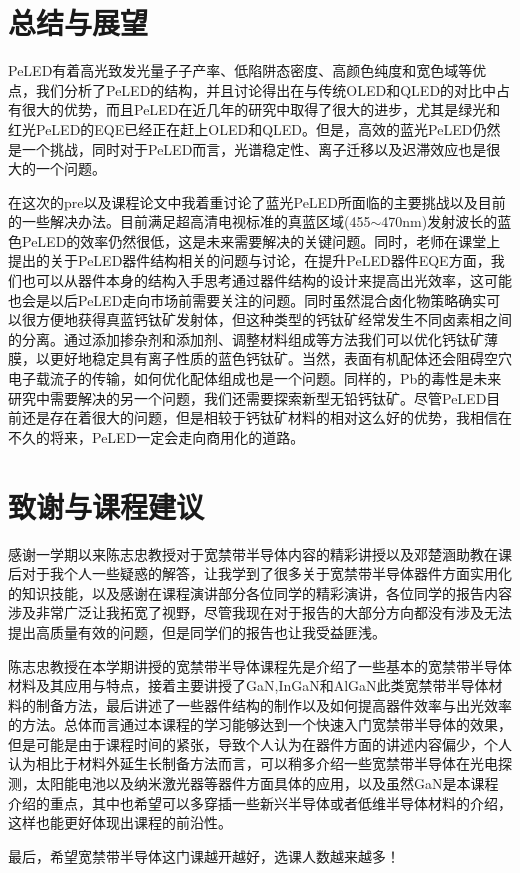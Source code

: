 \documentclass{phyasgn}\usepackage{nag}
\begin{document}
\section{总结与展望}
\par PeLED有着高光致发光量子子产率、低陷阱态密度、高颜色纯度和宽色域等优点，我们分析了PeLED的结构，并且讨论得出在与传统OLED和QLED的对比中占有很大的优势，而且PeLED在近几年的研究中取得了很大的进步，尤其是绿光和红光PeLED的EQE已经正在赶上OLED和QLED。但是，高效的蓝光PeLED仍然是一个挑战，同时对于PeLED而言，光谱稳定性、离子迁移以及迟滞效应也是很大的一个问题。
\par 在这次的pre以及课程论文中我着重讨论了蓝光PeLED所面临的主要挑战以及目前的一些解决办法。目前满足超高清电视标准的真蓝区域(455$\sim$470nm)发射波长的蓝色PeLED的效率仍然很低，这是未来需要解决的关键问题。同时，老师在课堂上提出的关于PeLED器件结构相关的问题与讨论，在提升PeLED器件EQE方面，我们也可以从器件本身的结构入手思考通过器件结构的设计来提高出光效率，这可能也会是以后PeLED走向市场前需要关注的问题。同时虽然混合卤化物策略确实可以很方便地获得真蓝钙钛矿发射体，但这种类型的钙钛矿经常发生不同卤素相之间的分离。通过添加掺杂剂和添加剂、调整材料组成等方法我们可以优化钙钛矿薄膜，以更好地稳定具有离子性质的蓝色钙钛矿。当然，表面有机配体还会阻碍空穴电子载流子的传输，如何优化配体组成也是一个问题。同样的，Pb的毒性是未来研究中需要解决的另一个问题，我们还需要探索新型无铅钙钛矿。尽管PeLED目前还是存在着很大的问题，但是相较于钙钛矿材料的相对这么好的优势，我相信在不久的将来，PeLED一定会走向商用化的道路。
\clearpage
\section{致谢与课程建议}
\par 感谢一学期以来陈志忠教授对于宽禁带半导体内容的精彩讲授以及邓楚涵助教在课后对于我个人一些疑惑的解答，让我学到了很多关于宽禁带半导体器件方面实用化的知识技能，以及感谢在课程演讲部分各位同学的精彩演讲，各位同学的报告内容涉及非常广泛让我拓宽了视野，尽管我现在对于报告的大部分方向都没有涉及无法提出高质量有效的问题，但是同学们的报告也让我受益匪浅。
\par 陈志忠教授在本学期讲授的宽禁带半导体课程先是介绍了一些基本的宽禁带半导体材料及其应用与特点，接着主要讲授了GaN,InGaN和AlGaN此类宽禁带半导体材料的制备方法，最后讲述了一些器件结构的制作以及如何提高器件效率与出光效率的方法。总体而言通过本课程的学习能够达到一个快速入门宽禁带半导体的效果，但是可能是由于课程时间的紧张，导致个人认为在器件方面的讲述内容偏少，个人认为相比于材料外延生长制备方法而言，可以稍多介绍一些宽禁带半导体在光电探测，太阳能电池以及纳米激光器等器件方面具体的应用，以及虽然GaN是本课程介绍的重点，其中也希望可以多穿插一些新兴半导体或者低维半导体材料的介绍，这样也能更好体现出课程的前沿性。
\par 最后，希望宽禁带半导体这门课越开越好，选课人数越来越多！
\clearpage
\printbibliography[heading=bibintoc]
\end{document}
